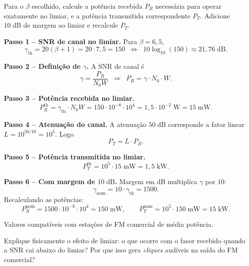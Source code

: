 \documentclass[11pt,a4paper]{article}
\begin{document}
\begin{enunciado}[Item c)]
Para o $\beta$ escolhido, calcule a potência recebida $P_R$ necessária para operar exatamente no limiar, e a potência transmitida correspondente $P_T$. Adicione $10\;\text{dB}$ de margem ao limiar e recalcule $P_T$.
\end{enunciado}

\begin{resolucao}

\textbf{Passo 1 -- SNR de canal no limiar.} Para $\beta = 6{,}5$,
\[
  \gamma_{\text{th}} = 20(\beta + 1) = 20 \cdot 7{,}5 = 150 \;\;\Leftrightarrow\;\; 10\log_{10}(150) \approx 21{,}76\;\text{dB}.
\]

\textbf{Passo 2 -- Definição de $\gamma$.} A SNR de canal é
\[
  \gamma = \frac{P_R}{N_0 W} \;\;\Rightarrow\;\; P_R = \gamma \cdot N_0 \cdot W.
\]

\textbf{Passo 3 -- Potência recebida no limiar.}
\[
  P_R^{\text{th}} = \gamma_{\text{th}} \cdot N_0 W = 150 \cdot 10^{-8} \cdot 10^4 = 1{,}5 \cdot 10^{-2}\;\text{W} = \boxed{15\;\text{mW}.}
\]

\textbf{Passo 4 -- Atenuação do canal.} A atenuação $50\;\text{dB}$ corresponde a fator linear $L = 10^{50/10} = 10^5$. Logo
\[
  P_T = L \cdot P_R.
\]

\textbf{Passo 5 -- Potência transmitida no limiar.}
\[
  P_T^{\text{th}} = 10^5 \cdot 15\;\text{mW} = 1{,}5\;\text{kW}.
\]

\textbf{Passo 6 -- Com margem de $10\;\text{dB}$.} Margem em dB multiplica $\gamma$ por $10$:
\[
  \gamma_{\text{nom}} = 10 \cdot \gamma_{\text{th}} = 1500.
\]
Recalculando as potências:
\[
  P_R^{\text{nom}} = 1500 \cdot 10^{-8} \cdot 10^4 = 150\;\text{mW}, \qquad
  P_T^{\text{nom}} = 10^5 \cdot 150\;\text{mW} = 15\;\text{kW}.
\]

Valores compatíveis com estações de FM comercial de média potência.
\end{resolucao}

\begin{enunciado}[Item d)]
Explique fisicamente o efeito de limiar: o que ocorre com o fasor recebido quando a SNR cai abaixo do limiar? Por que isso gera \emph{cliques} audíveis na saída do FM comercial?
\end{enunciado}
\end{document}
